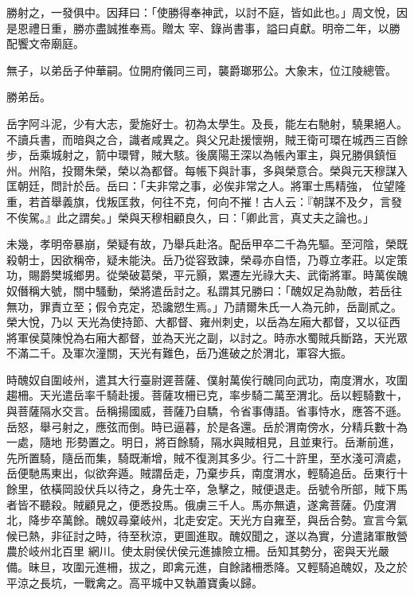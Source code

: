 \begin{pinyinscope}
 勝射之，一發俱中。因拜曰：「使勝得奉神武，以討不庭，皆如此也。」周文悅，因是恩禮日重，勝亦盡誠推奉焉。贈太
 宰、錄尚書事，謚曰貞獻。明帝二年，以勝配饗文帝廟庭。



 無子，以弟岳子仲華嗣。位開府儀同三司，襲爵瑯邪公。大象末，位江陵總管。



 勝弟岳。



 岳字阿斗泥，少有大志，愛施好士。初為太學生。及長，能左右馳射，驍果絕人。不讀兵書，而暗與之合，識者咸異之。與父兄赴援懷朔，賊王衛可環在城西三百餘步，岳乘城射之，箭中環臂，賊大駭。後廣陽王深以為帳內軍主，與兄勝俱鎮恒州。州陷，投爾朱榮，榮以為都督。每帳下與計事，多與榮意合。榮與元天穆謀入匡朝廷，問計於岳。岳曰：「夫非常之事，必俟非常之人。將軍士馬精強，
 位望隆重，若首舉義旗，伐叛匡救，何往不克，何向不摧！古人云：『朝謀不及夕，言發不俟駕。』此之謂矣。」榮與天穆相顧良久，曰：「卿此言，真丈夫之論也。」



 未幾，孝明帝暴崩，榮疑有故，乃舉兵赴洛。配岳甲卒二千為先驅。至河陰，榮既殺朝士，因欲稱帝，疑未能決。岳乃從容致諫，榮尋亦自悟，乃尊立孝莊。以定策功，賜爵樊城鄉男。從榮破葛榮，平元顥，累遷左光祿大夫、武衛將軍。時萬俟醜奴僭稱大號，關中騷動，榮將遣岳討之。私謂其兄勝曰：「醜奴足為勍敵，若岳往無功，罪責立至；假令克定，恐讒愬生焉。」乃請爾朱氏一人為元帥，岳副貳之。榮大悅，乃以
 天光為使持節、大都督、雍州刺史，以岳為左廂大都督，又以征西將軍侯莫陳悅為右廂大都督，並為天光之副，以討之。時赤水蜀賊兵斷路，天光眾不滿二千。及軍次潼關，天光有難色，岳乃進破之於渭北，軍容大振。



 時醜奴自圍岐州，遣其大行臺尉遲菩薩、僕射萬俟行醜同向武功，南度渭水，攻圍趨柵。天光遣岳率千騎赴援。菩薩攻柵已克，率步騎二萬至渭北。岳以輕騎數十，與菩薩隔水交言。岳稱揚國威，菩薩乃自驕，令省事傳語。省事恃水，應答不遜。岳怒，舉弓射之，應弦而倒。時已逼暮，於是各還。岳於渭南傍水，分精兵數十為一處，隨地
 形勢置之。明日，將百餘騎，隔水與賊相見，且並東行。岳漸前進，先所置騎，隨岳而集，騎既漸增，賊不復測其多少。行二十許里，至水淺可濟處，岳便馳馬東出，似欲奔遁。賊謂岳走，乃棄步兵，南度渭水，輕騎追岳。岳東行十餘里，依橫岡設伏兵以待之，身先士卒，急擊之，賊便退走。岳號令所部，賊下馬者皆不聽殺。賊顧見之，便悉投馬。俄虜三千人。馬亦無遺，遂禽菩薩。仍度渭北，降步卒萬餘。醜奴尋棄岐州，北走安定。天光方自雍至，與岳合勢。宣言今氣候已熱，非征討之時，待至秋涼，更圖進取。醜奴聞之，遂以為實，分遣諸軍散營農於岐州北百里
 網川。使太尉侯伏侯元進據險立柵。岳知其勢分，密與天光嚴備。昧旦，攻圍元進柵，拔之，即禽元進，自餘諸柵悉降。又輕騎追醜奴，及之於平涼之長坑，一戰禽之。高平城中又執蕭寶夤以歸。




\end{pinyinscope}
